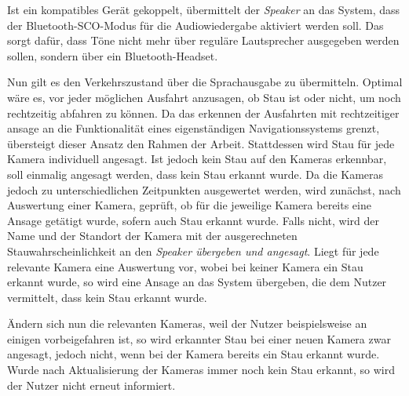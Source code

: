 Ist ein kompatibles Gerät gekoppelt, übermittelt der {\em Speaker} an das System, dass der Bluetooth-SCO-Modus für die Audiowiedergabe aktiviert werden soll. Das sorgt dafür, dass Töne nicht mehr über reguläre Lautsprecher ausgegeben werden sollen, sondern über ein Bluetooth-Headset.

Nun gilt es den Verkehrszustand über die Sprachausgabe zu übermitteln.
Optimal wäre es, vor jeder möglichen Ausfahrt anzusagen, ob Stau ist oder nicht, um noch rechtzeitig abfahren zu können.
Da das erkennen der Ausfahrten mit rechtzeitiger ansage an die Funktionalität eines eigenständigen Navigationssystems grenzt, übersteigt dieser Ansatz den Rahmen der Arbeit.
Stattdessen wird Stau für jede Kamera individuell angesagt.
Ist jedoch kein Stau auf den Kameras erkennbar, soll einmalig angesagt werden, dass kein Stau erkannt wurde.
Da die Kameras jedoch zu unterschiedlichen Zeitpunkten ausgewertet werden, wird zunächst, nach Auswertung einer Kamera, geprüft, ob für die jeweilige Kamera bereits eine Ansage getätigt wurde, sofern auch Stau erkannt wurde. Falls nicht, wird der Name und der Standort der Kamera mit der ausgerechneten Stauwahrscheinlichkeit an den {\em Speaker übergeben und angesagt}. Liegt für jede relevante Kamera eine Auswertung vor, wobei bei keiner Kamera ein Stau erkannt wurde, so wird eine Ansage an das System übergeben, die dem Nutzer vermittelt, dass kein Stau erkannt wurde.

Ändern sich nun die relevanten Kameras, weil der Nutzer beispielsweise an einigen vorbeigefahren ist, so wird erkannter Stau bei einer neuen Kamera zwar angesagt, jedoch nicht, wenn bei der Kamera bereits ein Stau erkannt wurde. Wurde nach Aktualisierung der Kameras immer noch kein Stau erkannt, so wird der Nutzer nicht erneut informiert.
